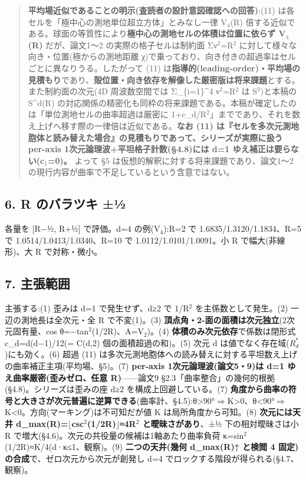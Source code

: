\documentclass[
]{ltjsarticle}
\begin{document}
\begin{quote}
\textbf{平均場近似であることの明示(査読者の設計意図確認への回答)}:(11)
は各セルを「極中心の測地単位超立方体」とみなし一律 V\(_{4}\)(R)
倍する近似である。球面の等質性により\textbf{極中心の測地セルの体積は位置に依らず
V\(_{4}\)(R)} だが、論文1〜2 の実際の格子セルは制約面
Σν\(^{2}\)=R\(^{2}\) に対して様々な向き・位置(極からの測地距離
χ)で乗っており、向き付きの超過率はセルごとに異なりうる。したがって (11)
は\textbf{指導的(leading-order)・平均場の見積もり}であり、\textbf{殻位置・向き依存を解像した厳密版は将来課題}とする。また制約面の次元(4D
周波数空間では Σ\_\{i=1\}\^{}4 ν\(^{2}\)=R\(^{2}\) は S\(^{3}\))と本稿の
S\^{}d(R)
の対応関係の精密化も同枠の将来課題である。本稿が確定したのは「単位測地セルの曲率超過は厳密に
1+c\_d/R\(^{2}\)」までであり、それを数え上げへ移す際の一律倍は近似である。\textbf{なお
(11)
は『セルを多次元測地胞体と読み替えた場合』の見積もりであって、シリーズが実際に扱う
per-axis 1次元論理波+平坦格子計数(§4.8)には d=1
ゆえ補正は要らない(c\(_{1}\)=0)。} よって §5
は仮想的解釈に対する将来課題であり、論文1〜2
の現行内容が曲率で不足しているという含意ではない。
\end{quote}

\subsection{6. R のバラツキ
±½}\label{r-ux306eux30d0ux30e9ux30c4ux30ad-uxbd}

各量を {[}R−½, R+½{]} で評価。d=4 の例(V\(_{4}\)):R=2 で
1.6835/1.3120/1.1834、R=5 で 1.0514/1.0413/1.0340、R=10 で
1.0112/1.0101/1.0091。小 R で幅大(非線形)、大 R で対称・微小。

\subsection{7. 主張範囲}\label{ux4e3bux5f35ux7bc4ux56f2}

主張する:(1) 歪みは d=1 で発生せず、d≥2 で 1/R\(^{2}\)
を主係数として発生。(2) 一辺の測地長は全次元・全 R で不変(1)。(3)
\textbf{頂点角・2-面の面積は次元独立}(2次元固有量、cos
θ=−tan\(^{2}\)(1/2R)、A=V\(_{2}\))。(4)
\textbf{体積のみ次元依存}で係数は閉形式 c\_d=d(d−1)/12(= C(d,2)
個の面積超過の和)。(5) 次元 d
は値でなく存在域(\(R^{*}_{d}\))にも効く。(6) 超過 (11)
は多次元測地胞体への読み替えに対する平坦数え上げの曲率補正主項(平均場、§5)。(7)
\textbf{per-axis 1次元論理波(論文5・9)は d=1 ゆえ曲率厳密(歪みゼロ、任意
R)}------論文9 §2.3「曲率整合」の幾何的根拠(§4.8)。シリーズは歪みの座
d≥2 を構成上回避している。(7)
\textbf{角度から曲率の符号と大きさが次元普遍に逆算できる}(曲率計、§4.5):θ\textgreater90°\(\Longrightarrow\)K\textgreater0、θ\textless90°\(\Longrightarrow\)K\textless0。方向(マーキング)は不可知だが値
K は局所角度から可知。(8) \textbf{次元には天井
d\_max(R)=\(\lfloor\)csc\(^{2}\)(1/2R)\(\rfloor\)≈4R\(^{2}\)
と曖昧さがあり}、±½ 下の相対曖昧さは小 R
で増大(§4.6)。次元の共役量の候補は1軸あたり曲率負荷
κ=sin\(^{2}\)(1/2R)≈K/4(d·κ≤1、観察)。(9) \textbf{二つの天井(幾何
d\_max(R)↑ と検閲 4 固定)の合成}で、ゼロ次元から次元が創発し d=4
でロックする階段が得られる(§4.7、観察)。
\end{document}
